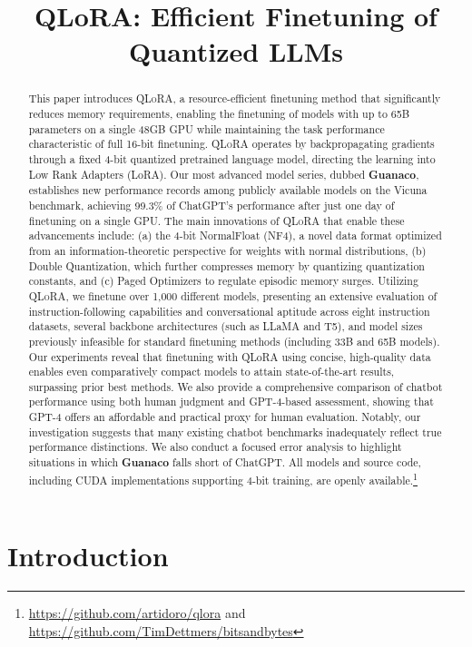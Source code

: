 \title{QLoRA: Efficient Finetuning of Quantized LLMs}

\begin{abstract}
This paper introduces \textsc{QLoRA}, a resource-efficient finetuning method that significantly reduces memory requirements, enabling the finetuning of models with up to 65B parameters on a single 48GB GPU while maintaining the task performance characteristic of full 16-bit finetuning. \textsc{QLoRA} operates by backpropagating gradients through a fixed 4-bit quantized pretrained language model, directing the learning into Low Rank Adapters (LoRA). Our most advanced model series, dubbed \textbf{Guanaco}, establishes new performance records among publicly available models on the Vicuna benchmark, achieving 99.3\% of ChatGPT’s performance after just one day of finetuning on a single GPU. The main innovations of \textsc{QLoRA} that enable these advancements include: (a) the 4-bit NormalFloat (NF4), a novel data format optimized from an information-theoretic perspective for weights with normal distributions, (b) Double Quantization, which further compresses memory by quantizing quantization constants, and (c) Paged Optimizers to regulate episodic memory surges. Utilizing \textsc{QLoRA}, we finetune over 1,000 different models, presenting an extensive evaluation of instruction-following capabilities and conversational aptitude across eight instruction datasets, several backbone architectures (such as LLaMA and T5), and model sizes previously infeasible for standard finetuning methods (including 33B and 65B models). Our experiments reveal that finetuning with QLoRA using concise, high-quality data enables even comparatively compact models to attain state-of-the-art results, surpassing prior best methods. We also provide a comprehensive comparison of chatbot performance using both human judgment and GPT-4-based assessment, showing that GPT-4 offers an affordable and practical proxy for human evaluation. Notably, our investigation suggests that many existing chatbot benchmarks inadequately reflect true performance distinctions. We also conduct a focused error analysis to highlight situations in which \textbf{Guanaco} falls short of ChatGPT. All models and source code, including CUDA implementations supporting 4-bit training, are openly available.\footnote{\url{https://github.com/artidoro/qlora} and \url{https://github.com/TimDettmers/bitsandbytes}}
\end{abstract}

\section{Introduction}


